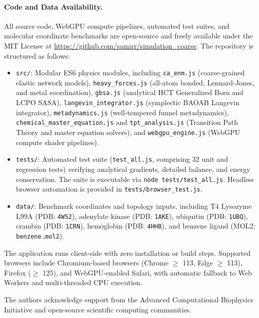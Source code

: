 \documentclass[journal=jpcbfk,manuscript=article]{achemso}
\begin{document}
\paragraph{Code and Data Availability.}
All source code, WebGPU compute pipelines, automated test suites, and molecular coordinate benchmarks are open-source and freely available under the MIT License at \url{https://github.com/samirr/simulation_coarse}. The repository is structured as follows:
\begin{itemize}
\item \texttt{src/}: Modular ES6 physics modules, including \texttt{ca\_enm.js} (coarse-grained elastic network models), \texttt{heavy\_forces.js} (all-atom bonded, Lennard-Jones, and metal coordination), \texttt{gbsa.js} (analytical HCT Generalized Born and LCPO SASA), \texttt{langevin\_integrator.js} (symplectic BAOAB Langevin integrator), \texttt{metadynamics.js} (well-tempered funnel metadynamics), \texttt{chemical\_master\_equation.js} and \texttt{tpt\_analysis.js} (Transition Path Theory and master equation solvers), and \texttt{webgpu\_engine.js} (WebGPU compute shader pipelines).
\item \texttt{tests/}: Automated test suite (\texttt{test\_all.js}, comprising 32 unit and regression tests) verifying analytical gradients, detailed balance, and energy conservation. The suite is executable via \texttt{node tests/test\_all.js}. Headless browser automation is provided in \texttt{tests/browser\_test.js}.
\item \texttt{data/}: Benchmark coordinates and topology inputs, including T4 Lysozyme L99A (PDB: \texttt{4W52}), adenylate kinase (PDB: \texttt{1AKE}), ubiquitin (PDB: \texttt{1UBQ}), crambin (PDB: \texttt{1CRN}), hemoglobin (PDB: \texttt{4HHB}), and benzene ligand (MOL2: \texttt{benzene.mol2}).
\end{itemize}
The application runs client-side with zero installation or build steps. Supported browsers include Chromium-based browsers (Chrome $\ge$ 113, Edge $\ge$ 113), Firefox ($\ge$ 125), and WebGPU-enabled Safari, with automatic fallback to Web Workers and multi-threaded CPU execution.

\begin{acknowledgement}
The authors acknowledge support from the Advanced Computational Biophysics Initiative and open-source scientific computing communities.
\end{acknowledgement}


\end{document}
